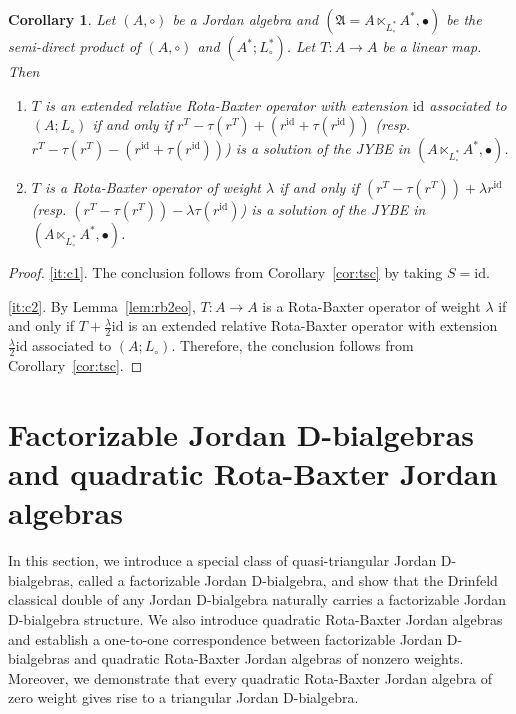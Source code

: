 \documentclass[12pt, reqno, a4paper]{amsart}
\newtheorem{corollary}[theorem]{Corollary}
\theoremstyle{definition}
\newcommand{\id}{\mathrm{id}}
\begin{document}
\begin{corollary}\label{coro:eo2jy}
	Let $(A, \circ)$ be a Jordan algebra and  $(\mathfrak{A} = A \ltimes_{L_{\circ}^*} A^*, \bullet)$ be the semi-direct product of $(A, \circ)$ and $(A^*; L_{\circ}^*)$.
	Let $T: A \to A$ be a linear map.
	Then
 \begin{enumerate}[label=(\roman*)]
		\item\label{it:c1}
		      $T$ is an extended relative Rota-Baxter operator with extension $\id$ associated to $(A; L_{\circ})$ if and only if $r^T - \tau(r^T) + (r^\id + \tau(r^\id))$ (resp. $r^T - \tau(r^T) - (r^\id + \tau(r^\id))$) is a solution of the JYBE in $(A \ltimes_{L_{\circ}^*} A^*, \bullet)$.

		\item\label{it:c2}
		      $T$ is a Rota-Baxter operator of weight $\lambda$ if and only if $(r^T - \tau(r^T)) + \lambda r^\id$ (resp. $(r^T - \tau(r^T)) - \lambda \tau(r^\id)$)  is a solution of the JYBE in $(A \ltimes_{L_{\circ}^*} A^*, \bullet)$.
	\end{enumerate}
\end{corollary}
\begin{proof}
	 \ref{it:c1}.
	The conclusion follows from Corollary~\ref{cor:tsc} by taking $S = \id$.

	\ref{it:c2}.
	By Lemma~\ref{lem:rb2eo}, $T: A \to A$ is a Rota-Baxter operator of weight $\lambda$ if and only if $T + \frac{\lambda}{2}\id$ is an extended relative Rota-Baxter operator with extension $\frac{\lambda}{2}\id$ associated to $(A; L_{\circ})$.
	Therefore, the conclusion follows from Corollary~\ref{cor:tsc}.
\end{proof}


\section{Factorizable Jordan D-bialgebras and quadratic Rota-Baxter Jordan algebras}\label{sec:quadrbj}
In this section, we introduce a special class of quasi-triangular Jordan D-bialgebras, called a factorizable Jordan D-bialgebra, and show that the Drinfeld classical double of any Jordan D-bialgebra naturally carries a factorizable Jordan D-bialgebra structure.
We also introduce quadratic Rota-Baxter Jordan algebras and establish a one-to-one correspondence between factorizable Jordan D-bialgebras and quadratic Rota-Baxter Jordan algebras of nonzero weights.
Moreover, we demonstrate that every quadratic Rota-Baxter Jordan algebra of zero weight gives rise to a triangular Jordan D-bialgebra. 
\end{document}
